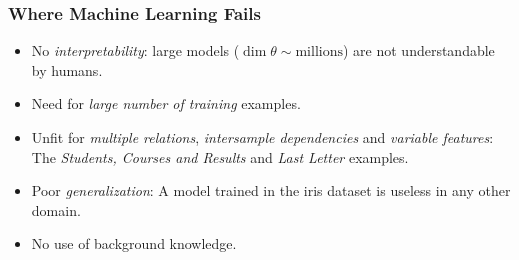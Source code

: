 \documentclass[bigger]{beamer}
\begin{document}
%
\begin{frame}
    \frametitle{Where Machine Learning Fails}
    \begin{itemize}
        \item No \emph{interpretability}: large models ($\dim \theta \sim \text{millions}$) are \alert{not understandable by humans}.
        \item Need for \emph{large number of training} examples.
        \item Unfit for \emph{multiple relations}, \emph{intersample dependencies} and \emph{variable features}: The \textit{Students, Courses and Results} and \emph{Last Letter} examples.
        \item Poor \emph{generalization}: A model trained in the iris dataset is useless in any other domain.
        \item \alert{No use of background knowledge}.
    \end{itemize}
\end{frame}
%
%
\end{document}
